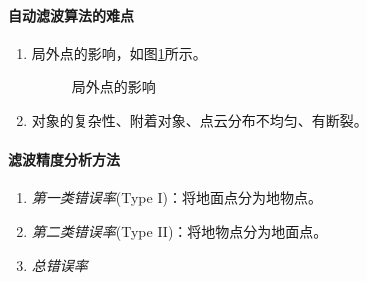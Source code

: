 \paragraph{自动滤波算法的难点}
\begin{enumerate}
	\item 局外点的影响，如图\ref{fig:局外点的影响}所示。
		\begin{figure}[htbp]
			\centering
			\quad\quad
			 \hfill
			 \hfill
			 \quad\quad
			\caption{局外点的影响}
			\label{fig:局外点的影响}
		\end{figure}
	\item 对象的复杂性、附着对象、点云分布不均匀、有断裂。
\end{enumerate}

\paragraph{滤波精度分析方法}
\begin{enumerate}
	\item \textit{第一类错误率}(Type I)：将地面点分为地物点。
	\item \textit{第二类错误率}(Type II)：将地物点分为地面点。
	\item \textit{总错误率}
\end{enumerate}


